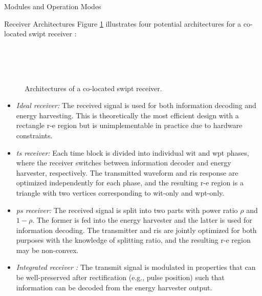 \begin{section}{}
\begin{subsection}{Modules and Operation Modes}
		\begin{subsubsection}{Receiver Architectures}\label{sc:receiver_architectures}
			Figure \ref{fg:swipt_receiver_architectures} illustrates four potential architectures for a co-located \gls{swipt} receiver \cite{Clerckx2022}:
			\begin{figure}[H]
				\centering
				\\
				\\
				\\
				\caption{
					Architectures of a co-located \gls{swipt} receiver.
				}
				\label{fg:swipt_receiver_architectures}
			\end{figure}

			\begin{itemize}
				\item \emph{Ideal receiver:} The received signal is used for both information decoding and energy harvesting. This is theoretically the most efficient design with a rectangle \gls{r-e} region but is unimplementable in practice due to hardware constraints.
				\item \emph{\gls{ts} receiver:} Each time block is divided into individual \gls{wit} and \gls{wpt} phases, where the receiver switches between information decoder and energy harvester, respectively. The transmitted waveform and \gls{ris} response are optimized independently for each phase, and the resulting \gls{r-e} region is a triangle with two vertices corresponding to \gls{wit}-only and \gls{wpt}-only.
				\item \emph{\gls{ps} receiver:} The received signal is split into two parts with power ratio $\rho$ and $1{-}\rho$. The former is fed into the energy harvester and the latter is used for information decoding. The transmitter and \gls{ris} are jointly optimized for both purposes with the knowledge of splitting ratio, and the resulting \gls{r-e} region may be non-convex.
				\item \emph{Integrated receiver \cite{Kim2021a}:} The transmit signal is modulated in properties that can be well-preserved after rectification (e.g., pulse position) such that information can be decoded from the energy harvester output.
			\end{itemize}


\end{subsubsection}
\end{subsection}
\end{section}
